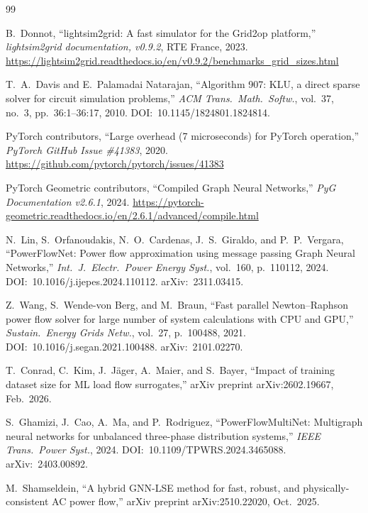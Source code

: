 \documentclass[11pt]{article}
\begin{document}
\begin{thebibliography}{99}

B.~Donnot,
``lightsim2grid: A fast simulator for the Grid2op platform,''
\textit{lightsim2grid documentation, v0.9.2},
RTE France, 2023.
\url{https://lightsim2grid.readthedocs.io/en/v0.9.2/benchmarks_grid_sizes.html}

T.~A.~Davis and E.~Palamadai Natarajan,
``Algorithm 907: KLU, a direct sparse solver for circuit simulation
problems,''
\textit{ACM Trans.\ Math.\ Softw.}, vol.~37, no.~3, pp.~36:1--36:17, 2010.
DOI:~10.1145/1824801.1824814.

PyTorch contributors,
``Large overhead (7 microseconds) for PyTorch operation,''
\textit{PyTorch GitHub Issue \#41383}, 2020.
\url{https://github.com/pytorch/pytorch/issues/41383}

PyTorch Geometric contributors,
``Compiled Graph Neural Networks,''
\textit{PyG Documentation v2.6.1}, 2024.
\url{https://pytorch-geometric.readthedocs.io/en/2.6.1/advanced/compile.html}

N.~Lin, S.~Orfanoudakis, N.~O.~Cardenas, J.~S.~Giraldo, and P.~P.~Vergara,
``PowerFlowNet: Power flow approximation using message passing Graph Neural
Networks,''
\textit{Int.\ J.\ Electr.\ Power Energy Syst.}, vol.~160, p.~110112, 2024.
DOI:~10.1016/j.ijepes.2024.110112.
arXiv:~2311.03415.

Z.~Wang, S.~Wende-von Berg, and M.~Braun,
``Fast parallel Newton--Raphson power flow solver for large number of system
calculations with CPU and GPU,''
\textit{Sustain.\ Energy Grids Netw.}, vol.~27, p.~100488, 2021.
DOI:~10.1016/j.segan.2021.100488.
arXiv:~2101.02270.

T.~Conrad, C.~Kim, J.~J\"{a}ger, A.~Maier, and S.~Bayer,
``Impact of training dataset size for ML load flow surrogates,''
arXiv preprint arXiv:2602.19667, Feb.\ 2026.

S.~Ghamizi, J.~Cao, A.~Ma, and P.~Rodriguez,
``PowerFlowMultiNet: Multigraph neural networks for unbalanced three-phase
distribution systems,''
\textit{IEEE Trans.\ Power Syst.}, 2024.
DOI:~10.1109/TPWRS.2024.3465088.
arXiv:~2403.00892.

M.~Shamseldein,
``A hybrid GNN-LSE method for fast, robust, and physically-consistent AC
power flow,''
arXiv preprint arXiv:2510.22020, Oct.\ 2025.


\end{thebibliography}
\end{document}
